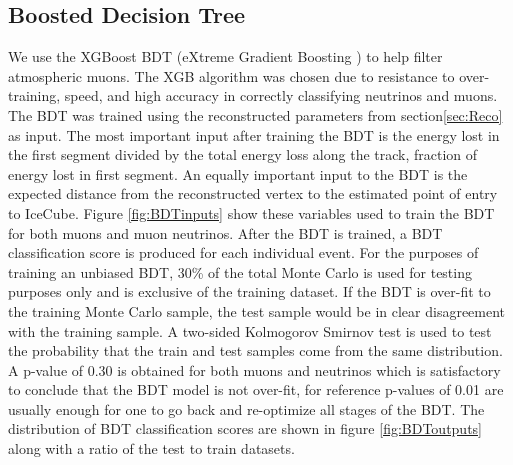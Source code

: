 \documentclass{PoS}
\begin{document}
\subsection{Boosted Decision Tree}\label{sec:ESTES_BDT}
We use the XGBoost BDT (eXtreme Gradient Boosting \cite{Chen:2016:XST:2939672.2939785})  to help filter atmospheric muons. The XGB algorithm was chosen due to resistance to over-training, speed, and high accuracy in correctly classifying neutrinos and muons.\\
The BDT was trained using the reconstructed parameters from section\ref{sec:Reco} as input. The most important input after training the BDT is the energy lost in the first segment divided by the total energy loss along the track, fraction of energy lost in first segment. An equally important input to the BDT is the expected distance from the reconstructed vertex to the estimated point of entry to IceCube. Figure \ref{fig:BDTinputs} show these variables used to train the BDT for both muons and muon neutrinos. After the BDT is trained, a BDT classification score is produced for each individual event. For the purposes of training an unbiased BDT, 30\% of the total Monte Carlo is used for testing purposes only and is exclusive of the training dataset. If the BDT is over-fit to the training Monte Carlo sample, the test sample would be in clear disagreement with the training sample. A two-sided Kolmogorov Smirnov test is used to test the probability that the train and test samples come from the same distribution. A p-value of 0.30 is obtained for both muons and neutrinos which is satisfactory to conclude that the BDT model is not over-fit, for reference p-values of 0.01 are usually enough for one to go back and re-optimize all stages of the BDT. The distribution of BDT classification scores are shown in figure \ref{fig:BDToutputs} along with a ratio of the test to train datasets.
\end{document}

